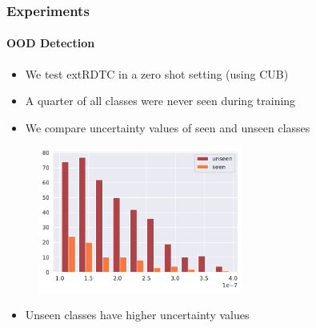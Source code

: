 \documentclass[9pt]{beamer}
\begin{document}
\begin{frame}
\frametitle{Experiments}
\framesubtitle{OOD Detection}
\begin{itemize}
	\item We test extRDTC in a zero shot setting (using CUB)
	\item A quarter of all classes were never seen during training
	\item We compare uncertainty values of seen and unseen classes
\end{itemize}
\begin{figure}
	\centering
	\includegraphics[width=0.6\textwidth]{images/zero_shot_class_uncertainty_median_hist.pdf}
\end{figure}
\begin{itemize}
	\item Unseen classes have higher uncertainty values
\end{itemize}
\end{frame} 
\end{document}
